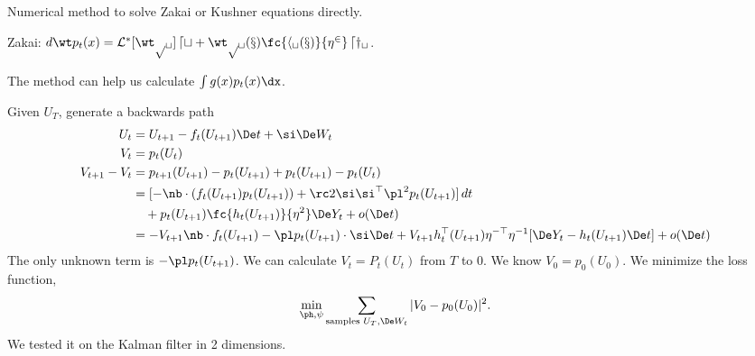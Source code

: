 Numerical method to solve Zakai or Kushner equations directly.

Zakai: $d\wt p_t(x) = \cal L^*[\wt p_t]\,dt + \wt p_t(x) \fc{h_t(x)}{\eta^2}\,dy_t$.

The method can help us calculate $\int g(x) p_t(x)\dx$. %

Given $U_T$, generate a backwards path
\begin{align}
U_t&=U_{t+1}-f_t(U_{t+1})\De t + \si \De W_t\\
V_t&=p_t(U_t)\\
V_{t+1}-V_t&=p_{t+1}(U_{t+1})
-p_t(U_{t+1}) + p_t(U_{t+1}) - p_t(U_t)\\
&=[-\nb \cdot (f_t(U_{t+1})p_t(U_{t+1})) + \rc2 \si\si^\top \pl^2p_t(U_{t+1})]\,dt\\
&\quad +p_t(U_{t+1}) \fc{h_t(U_{t+1})}{\eta^2}\De Y_t + o(\De t)\\
&=-V_{t+1}\nb \cdot f_t(U_{t+1}) - \pl p_t(U_{t+1})\cdot \si\De t
+V_{t+1}h_t^\top (U_{t+1}) \eta^{-\top} \eta^{-1} [\De Y_t - h_t(U_{t+1})\De t] + o(\De t)
\end{align}
The only unknown term is $-\pl p_t(U_{t+1})$.
We can calculate $V_t=P_t(U_t)$ %
 from $T$ to 0. We know $V_0=p_0(U_0)$. We minimize the loss function,
 \begin{align}
\min_{\ph,\psi} \sum_{\text{samples }U_T,\De W_t} |V_0-p_0(U_0)|^2.
\end{align}
We tested it on the Kalman filter in 2 dimensions.
